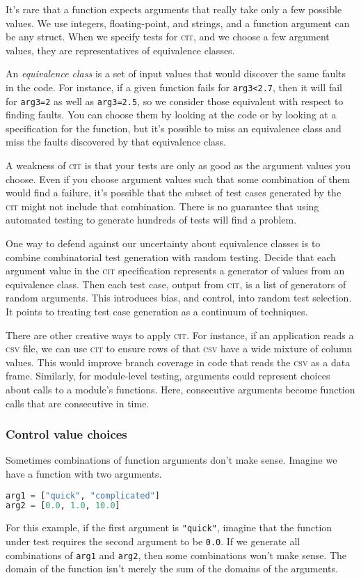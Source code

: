 \documentclass{juliacon}
\newcommand{\cit}{\textsc{cit}\xspace}
\newcommand{\csv}{\textsc{csv}\xspace}
\begin{document}
\vskip 6pt
It's rare that a function expects arguments that really take only a few possible values. We use integers, floating-point, and strings, and a function argument can be any struct. When we specify tests for \cit, and we choose a few argument values, they are representatives of equivalence classes.

\vskip 6pt
An \emph{equivalence class} is a set of input values that would discover the same faults in the code. For instance, if a given function fails for \verb|arg3<2.7|, then it will fail for \verb|arg3=2| as well as \verb|arg3=2.5|, so we consider those equivalent with respect to finding faults. You can choose them by looking at the code or by looking at a specification for the function, but it's possible to miss an equivalence class and miss the faults discovered by that equivalence class.

\vskip 6pt
A weakness of \cit is that your tests are only as good as the argument values you choose. Even if you choose argument values such that some combination of them would find a failure, it's possible that the subset of test cases generated by the \cit might not include that combination. There is no guarantee that using automated testing to generate hundreds of tests will find a problem.

\vskip 6pt
One way to defend against our uncertainty about equivalence classes is to combine combinatorial test generation with random testing. Decide that each argument value in the \cit specification represents a generator of values from an equivalence class. Then each test case, output from \cit, is a list of generators of random arguments. This introduces bias, and control, into random test selection. It points to treating test case generation as a continuum of techniques.

\vskip 6pt
There are other creative ways to apply \cit. For instance, if an application reads a \csv file, we can use \cit to ensure rows of that \csv have a wide mixture of column values. This would improve branch coverage in code that reads the \csv as a data frame. Similarly, for module-level testing, arguments could represent choices about calls to a module's functions. Here, consecutive arguments become function calls that are consecutive in time.


\subsubsection{Control value choices}

Sometimes combinations of function arguments don't make sense. Imagine we have a function with two arguments.
\begin{lstlisting}[language=Julia]
arg1 = ["quick", "complicated"]
arg2 = [0.0, 1.0, 10.0]
\end{lstlisting}
For this example, if the first argument is \verb|"quick"|, imagine that the function under test requires the second argument to be \verb|0.0|. If we generate all combinations of \verb|arg1| and \verb|arg2|, then some combinations won't make sense. The domain of the function isn't merely the sum of the domains of the arguments.
\end{document}
